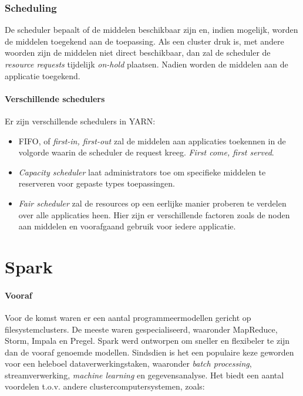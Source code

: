 \documentclass[a4paper,10pt,twoside]{report}
\begin{document}
\subsection{Scheduling}

De scheduler bepaalt of de middelen beschikbaar zijn en, indien mogelijk, worden de middelen toegekend aan de toepassing. Als een cluster druk is, met andere woorden zijn de middelen niet direct beschikbaar, dan zal de scheduler de \textit{resource requests} tijdelijk \textit{on-hold} plaatsen. Nadien worden de middelen aan de applicatie toegekend.

\subsubsection{Verschillende schedulers}

Er zijn verschillende schedulers in YARN:

\begin{itemize}
	\item FIFO, of \textit{first-in, first-out} zal de middelen aan applicaties toekennen in de volgorde waarin de scheduler de request kreeg. \textit{First come, first served}.
	\item \textit{Capacity scheduler} laat administrators toe om specifieke middelen te reserveren voor gepaste types toepassingen. 
	\item \textit{Fair scheduler} zal de resources op een eerlijke manier proberen te verdelen over alle applicaties heen. Hier zijn er verschillende factoren zoals de noden aan middelen en voorafgaand gebruik voor iedere applicatie.
\end{itemize}

\chapter{Spark}

\subsubsection{Vooraf}

Voor de komst waren er een aantal programmeermodellen gericht op filesystemclusters. De meeste waren gespecialiseerd, waaronder MapReduce, Storm, Impala en Pregel. Spark werd ontworpen om sneller en flexibeler te zijn dan de vooraf genoemde modellen. Sindsdien is het een populaire keze geworden voor een heleboel dataverwerkingstaken, waaronder \textit{batch processing}, streamverwerking, \textit{machine learning} en gegevensanalyse. Het biedt een aantal voordelen t.o.v. andere clustercomputersystemen, zoals: 
\end{document}
